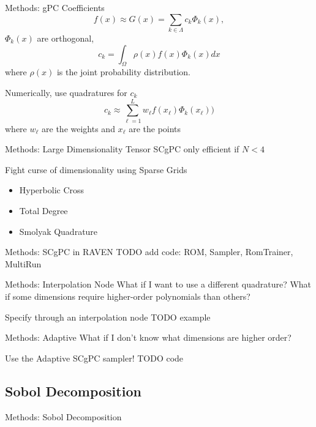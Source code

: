 \documentclass[t,9pt,svgnames]{beamer}
\begin{document}
\begin{frame}{Methods: gPC Coefficients}
  \begin{equation}
    f(x) \approx G(x) = \sum_{k\in\Lambda} c_k \Phi_k(x), 
  \end{equation}
  $\Phi_k(x)$ are orthogonal,
  \begin{equation}
    c_k = \int_\Omega \rho(x) f(x) \Phi_k(x) dx
  \end{equation}
  where $\rho(x)$ is the joint probability distribution.

  Numerically, use quadratures for $c_k$
  \begin{equation}
    c_k \approx\sum_{\ell=1}^L w_\ell f(x_\ell) \Phi_k(x_\ell))
  \end{equation}
  where $w_\ell$ are the weights and $x_\ell$ are the points
\end{frame}

\begin{frame}{Methods: Large Dimensionality}
  Tensor SCgPC only efficient if $N<4$

  Fight curse of dimensionality using Sparse Grids
  \begin{itemize}
    \item Hyperbolic Cross
    \item Total Degree
    \item Smolyak Quadrature
  \end{itemize}
\end{frame}

\begin{frame}{Methods: SCgPC in RAVEN}
  TODO add code: ROM, Sampler, RomTrainer, MultiRun
\end{frame}

\begin{frame}{Methods: Interpolation Node}
  What if I want to use a different quadrature?
  What if some dimensions require higher-order polynomials than others?

  Specify through an interpolation node
  TODO example
\end{frame}

\begin{frame}{Methods: Adaptive}
  What if I don't know what dimensions are higher order?

  Use the Adaptive SCgPC sampler!
  TODO code
\end{frame}

\subsection{Sobol Decomposition}
\begin{frame}{Methods: Sobol Decomposition}
\end{frame}
\end{document}
